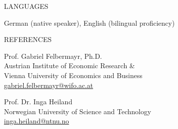 \documentclass{article}
\begin{document}

\begin{minipage}[t]{0.12\textwidth}
    {\selectfont LANGUAGES} \\
\end{minipage}
\hspace{5mm}
\begin{minipage}[t]{0.8\textwidth}
    German (native speaker), English (bilingual proficiency)
\end{minipage}
\medskip


\begin{minipage}[t]{0.12\textwidth}
    {\selectfont REFERENCES} \\
\end{minipage}
\hspace{5mm}
\begin{minipage}[t]{0.4\textwidth}
    Prof. Gabriel Felbermayr, Ph.D. \\
    Austrian Institute of Economic Research \& \\
    Vienna University of Economics and Business \\
\href{mailto:gabriel.felbermayr@wifo.ac.at}{gabriel.felbermayr@wifo.ac.at}
\end{minipage}
\hspace{5mm}
\begin{minipage}[t]{0.4\textwidth}
    Prof. Dr. Inga Heiland \\
    Norwegian University of Science and Technology \\
\href{mailto:inga.heiland@ntnu.no}{inga.heiland@ntnu.no}
\end{minipage}
\bigskip
\bigskip

\end{document}
